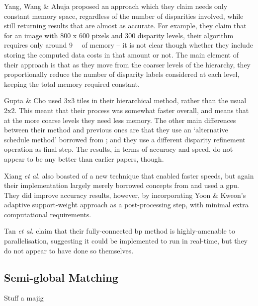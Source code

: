 Yang, Wang \& Ahuja \cite{Yang2010} proposed an approach which they claim needs only constant memory space, regardless of the number of disparities involved, while still returning results that are almost as accurate.  For example, they claim that for an image with 800 x 600 pixels and 300 disparity levels, their algorithm requires only around \SI{9}{\mebi\byte} of memory -- it is not clear though whether they include storing the computed data costs in that amount or not.  The main element of their approach is that as they move from the coarser levels of the hierarchy, they proportionally reduce the number of disparity labels considered at each level, keeping the total memory required constant.  %

Gupta \& Cho \cite{Gupta2012} used 3x3 tiles in their hierarchical method, rather than the usual 2x2.  This meant that their process was somewhat faster overall, and means that at the more coarse levels they need less memory.  The other main differences between their method and previous ones are that they use an `alternative schedule method' borrowed from \cite{Tappen2003}; and they use a different disparity refinement operation as final step.  The results, in terms of accuracy and speed, do not appear to be any better than earlier papers, though.

Xiang \textit{et al.} \cite{Xiang2012} also boasted of a new technique that enabled faster speeds, but again their implementation largely merely borrowed concepts from \cite{Felzenszwalb2006} and used a \gls{gpu}.  They did improve accuracy results, however, by incorporating Yoon \& Kweon's \cite{Yoon2005} adaptive support-weight approach as a post-processing step, with minimal extra computational requirements.

Tan \textit{et al.} \cite{Tan2017} claim that their fully-connected \gls{bp} method is highly-amenable to parallelisation, suggesting it could be implemented to run in real-time, but they do not appear to have done so themselves.

\subsection{Semi-global Matching}
Stuff a majig



